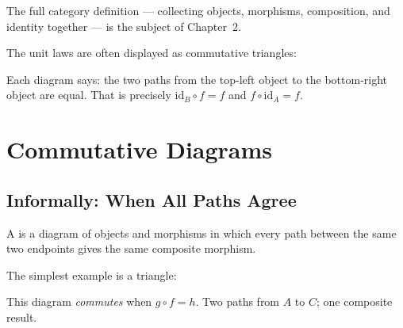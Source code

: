 The full category definition --- collecting objects, morphisms, composition,
and identity together --- is the subject of Chapter~2.

The unit laws are often displayed as commutative triangles:

\medskip
\begin{center}
\qquad
{}
\end{center}
\medskip

Each diagram says: the two paths from the top-left object to the
bottom-right object are equal. That is precisely $\mathrm{id}_B \circ f = f$
and $f \circ \mathrm{id}_A = f$.


\section{Commutative Diagrams}
\label{sec:commutative-diagrams}

\subsection{Informally: When All Paths Agree}

A  is a diagram of objects and morphisms in which
every path between the same two endpoints gives the same composite morphism.

The simplest example is a triangle:

\medskip
\begin{center}
\end{center}
\medskip

This diagram \emph{commutes} when $g \circ f = h$. Two paths from $A$ to $C$;
one composite result.

